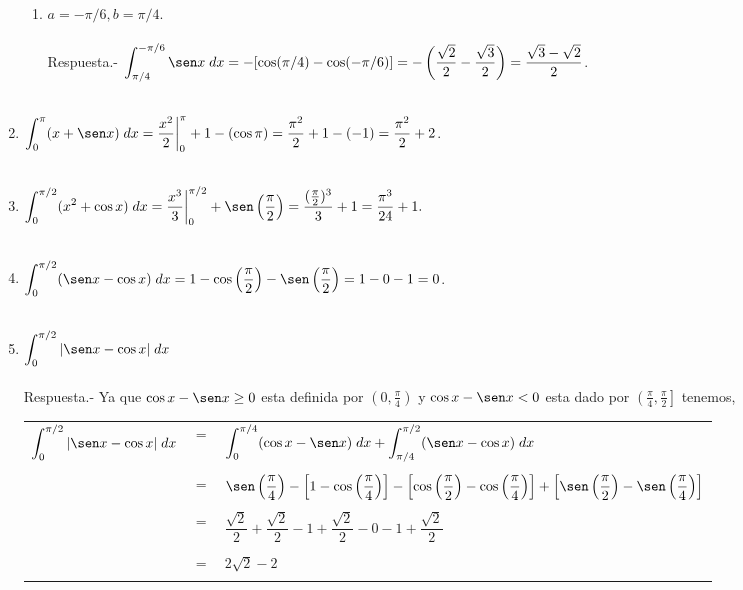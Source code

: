 \begin{enumerate}
\begin{enumerate}[\bfseries (a)]
	\item $a=-\pi/6,b=\pi/4$.\\\\
	    Respuesta.-\; $\displaystyle\int_{\pi/4}^{-\pi/6}\sen x \; dx = -[\cos(\pi/4) - \cos(-\pi/6)] = -\left(\dfrac{\sqrt{2}}{2}-\dfrac{\sqrt{3}}{2}\right) = \dfrac{\sqrt{3}-\sqrt{2}}{2}$.\\\\

    \end{enumerate}

\item $\displaystyle\int_{0}^\pi (x+\sen x)\; dx = \dfrac{x^2}{2}\bigg|_0^\pi + 1 - (\cos \pi) = \dfrac{\pi^2}{2}+1-(-1) = \dfrac{\pi^2}{2} + 2$.\\\\

\item $\displaystyle\int_{0}^{\pi/2} (x^2+\cos x)\; dx = \dfrac{x^3}{3}\bigg|_0^{\pi/2}+\sen\left(\dfrac{\pi}{2}\right) = \dfrac{(\frac{\pi}{2})^3}{3} + 1 = \dfrac{\pi^3}{24}+1.$\\\\

\item $\displaystyle\int_0^{\pi/2} (\sen x - \cos x)\; dx = 1-\cos \left(\dfrac{\pi}{2}\right) - \sen\left(\dfrac{\pi}{2}\right) = 1-0-1 = 0$.\\\\

\item $\displaystyle\int_0^{\pi/2} |\sen x - \cos x|\; dx$\\\\
    Respuesta.-\; Ya que $\cos x - \sen x \geq 0$ esta definida por $\left(0,\frac{\pi}{4}\right)$ y $\cos x - \sen x < 0$ esta dado por $\left(\frac{\pi}{4},\frac{\pi}{2}\right]$ tenemos,
    \begin{center}
	\begin{tabular}{rcl}
	    $\displaystyle\int_0^{\pi/2} |\sen x - \cos x|\; dx$&$=$&$\displaystyle\int_0^{\pi/4}(\cos x - \sen x)\; dx + \int_{\pi/4}^{\pi/2}(\sen x - \cos x)\; dx$\\\\
								&$=$&$\sen\left(\dfrac{\pi}{4}\right)-\left[1-\cos\left(\dfrac{\pi}{4}\right)\right]  -\left[\cos\left(\dfrac{\pi}{2}\right)-\cos\left(\dfrac{\pi}{4}\right)\right]+\left[\sen\left(\dfrac{\pi}{2}\right)-\sen \left(\dfrac{\pi}{4}\right)\right]$\\\\
								&$=$&$\dfrac{\sqrt{2}}{2}+\dfrac{\sqrt{2}}{2}-1+\dfrac{\sqrt{2}}{2}-0-1+\dfrac{\sqrt{2}}{2}$\\\\
	      &$=$&$2\sqrt{2}-2$\\\\
	  \end{tabular}
    \end{center}


\end{enumerate}
